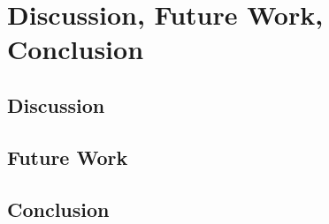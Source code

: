 \chapter{Discussion, Future Work, Conclusion}\label{ch:conclusion}

\section{Discussion}\label{sec:discussion}

\section{Future Work}\label{sec:future-work}

\section{Conclusion}\label{sec:conclusion}
